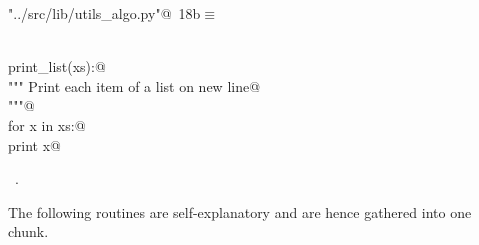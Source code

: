 \documentclass[11.5pt]{report}
\begin{document}
\begin{flushleft} \small\label{scrap9}\raggedright\small
{} \verb@"../src/lib/utils_algo.py"@\nobreak\ {\footnotesize {18b}}$\equiv$
\vspace{-1ex}
\begin{list}{}{} \item
\mbox{}\verb@@\\
\mbox{}\verb@def print_list(xs):@\\
\mbox{}\verb@    """ Print each item of a list on new line@\\
\mbox{}\verb@    """@\\
\mbox{}\verb@    for x in xs:@\\
\mbox{}\verb@        print x@\\
\mbox{}\verb@@{\NWsep}
\end{list}
\vspace{-1.5ex}
\footnotesize
\begin{list}{}{\setlength{\itemsep}{-\parsep}\setlength{\itemindent}{-\leftmargin}}
\item \NWtxtFileDefBy\ .

\item{}
\end{list}
\vspace{4ex}
\end{flushleft}
\newchunk The following routines are self-explanatory and are hence gathered into one chunk. 
\end{document}
